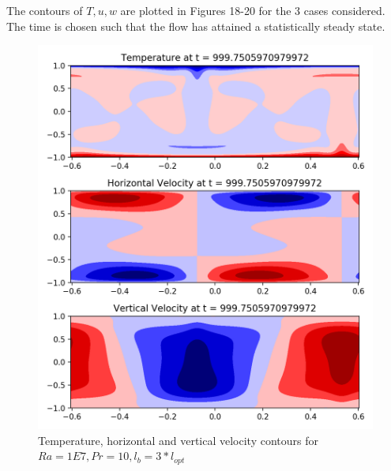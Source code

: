 \documentclass[12pt]{article}
\begin{document}
     The contours of $T,u,w$ are plotted in Figures 18-20 for the 3 cases considered. The time is chosen such that the flow has attained a statistically steady state.
     
     \begin{figure}[!htb]
     	\includegraphics[width=\linewidth]{contours_1E7_10_3.png}
     	\caption{Temperature, horizontal and vertical velocity contours for $Ra = 1E7, Pr =10, l_b = 3* l_{opt} $ }
     	\label{fig:fig18}
     \end{figure}
     
\end{document}
